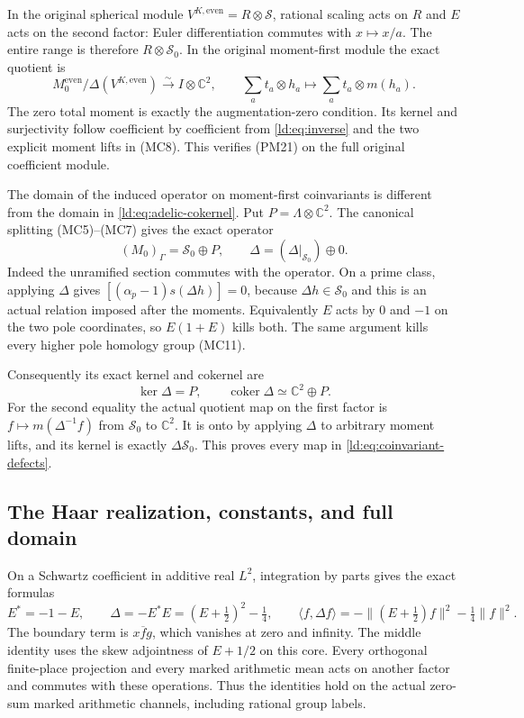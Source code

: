 \documentclass[11pt,a4paper]{article}
\theoremstyle{definition}\newtheorem{definition}[theorem]{Definition}
\newcommand{\C}{\mathbb C}\newcommand{\R}{\mathbb R}
\begin{document}
In the original spherical module
$V^{K,\mathrm{even}}=R\otimes\mathscr S$, rational scaling acts
on $R$ and $E$ acts on the second factor: Euler differentiation
commutes with $x\mapsto x/a$. The entire range is therefore
$R\otimes\mathscr S_0$. In the original moment-first module
the exact quotient is
\[
 M_0^{\mathrm{even}}/\Delta(V^{K,\mathrm{even}})
     \xrightarrow{\sim}I\otimes\C^2,
 \qquad\sum_at_a\otimes h_a\longmapsto
                        \sum_at_a\otimes m(h_a).
 \tag{LD2}\label{ld:eq:adelic-cokernel}
\]
The zero total moment is exactly the augmentation-zero condition.
Its kernel and surjectivity follow coefficient by coefficient from
\eqref{ld:eq:inverse} and the two explicit moment lifts in (MC8).
This verifies (PM21) on the full original coefficient module.

The domain of the induced operator on moment-first coinvariants
is different from the domain in \eqref{ld:eq:adelic-cokernel}.
Put $P=\Lambda\otimes\C^2$. The canonical splitting (MC5)--(MC7)
gives the exact operator
\[
 (M_0)_\Gamma=\mathscr S_0\oplus P,
 \qquad \Delta=(\Delta|_{\mathscr S_0})\oplus0.
 \tag{LD3}\label{ld:eq:coinvariant-operator}
\]
Indeed the unramified section commutes with the operator. On a
prime class, applying $\Delta$ gives
$[(\alpha_p-1)s(\Delta h)]=0$, because $\Delta h\in\mathscr S_0$
and this is an actual relation imposed after the moments.
Equivalently $E$ acts by $0$ and $-1$ on the two pole coordinates,
so $E(1+E)$ kills both. The same argument kills every higher pole
homology group (MC11).

Consequently its exact kernel and cokernel are
\[
 \ker\Delta=P,\qquad
 \operatorname{coker}\Delta\simeq\C^2\oplus P.
 \tag{LD4}\label{ld:eq:coinvariant-defects}
\]
For the second equality the actual quotient map on the first
factor is $f\mapsto m(\Delta^{-1}f)$ from $\mathscr S_0$ to
$\C^2$. It is onto by applying $\Delta$ to arbitrary moment
lifts, and its kernel is exactly $\Delta\mathscr S_0$.
This proves every map in \eqref{ld:eq:coinvariant-defects}.

\subsection{The Haar realization, constants, and full domain}

On a Schwartz coefficient in additive real $L^2$, integration
by parts gives the exact formulas
\[
 E^*=-1-E,\qquad
 \Delta=-E^*E=(E+\tfrac12)^2-\tfrac14,
 \qquad
 \langle f,\Delta f\rangle
     =-\|(E+\tfrac12)f\|^2-\tfrac14\|f\|^2.
 \tag{LD5}\label{ld:eq:haar-sign}
\]
The boundary term is $x\overline f g$, which vanishes at zero
and infinity. The middle identity uses the skew adjointness of
$E+1/2$ on this core. Every orthogonal finite-place projection
and every marked arithmetic mean acts on another factor and
commutes with these operations. Thus the identities hold on the
actual zero-sum marked arithmetic channels, including rational
group labels.
\end{document}
